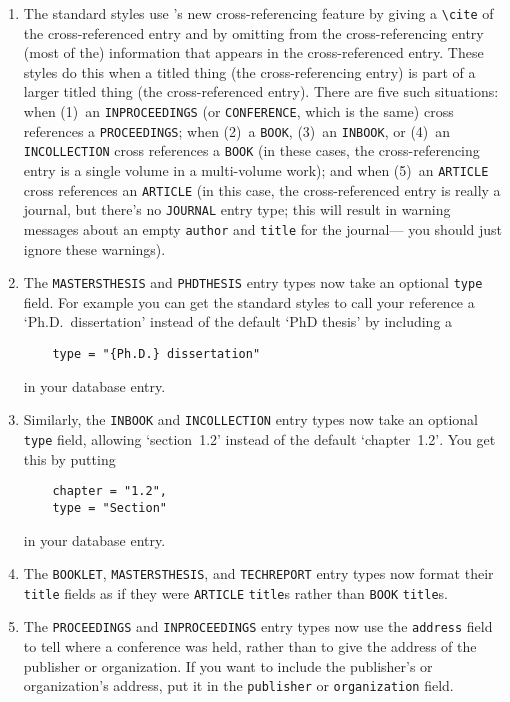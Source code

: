\begin{enumerate}
\item
The standard styles use \BibTeX's new cross-referencing feature
by giving a \verb|\cite| of the cross-referenced entry and by
omitting from the cross-referencing entry
(most of the) information that appears
in the cross-referenced entry.
These styles do this when
a titled thing (the cross-referencing entry)
is part of a larger titled thing (the cross-referenced entry).
There are five such situations:
when (1)~an \hbox{\tt INPROCEEDINGS}
(or \hbox{\tt CONFERENCE}, which is the same)
cross references a \hbox{\tt PROCEEDINGS};
when (2)~a {\tt BOOK}, (3)~an \hbox{\tt INBOOK},
or (4)~an \hbox{\tt INCOLLECTION}
cross references a {\tt BOOK}
(in these cases, the cross-referencing entry is a single
volume in a multi-volume work);
and when (5)~an \hbox{\tt ARTICLE}
cross references an \hbox{\tt ARTICLE}
(in this case, the cross-referenced entry is really a journal,
but there's no \hbox{\tt JOURNAL} entry type;
this will result in warning messages about
an empty \hbox{\tt author} and \hbox{\tt title} for the journal---%
you should just ignore these warnings).

\item
The \hbox{\tt MASTERSTHESIS} and \hbox{\tt PHDTHESIS}
entry types now take an optional {\tt type} field.
For example you can get the standard styles to
call your reference a `Ph.D.\ dissertation'
instead of the default `PhD thesis' by including a
\begin{verbatim}
    type = "{Ph.D.} dissertation"
\end{verbatim}
in your database entry.

\item
Similarly, the \hbox{\tt INBOOK} and \hbox{\tt INCOLLECTION}
entry types now take an optional {\tt type} field,
allowing `section~1.2' instead of the default `chapter~1.2'$\!$.
You get this by putting
\begin{verbatim}
    chapter = "1.2",
    type = "Section"
\end{verbatim}
in your database entry.

\item
The \hbox{\tt BOOKLET}, \hbox{\tt MASTERSTHESIS},
and \hbox{\tt TECHREPORT} entry types now format
their \hbox{\tt title} fields as if they were
\hbox{\tt ARTICLE} \hbox{\tt title}s
rather than \hbox{\tt BOOK} \hbox{\tt title}s.

\item
The \hbox{\tt PROCEEDINGS} and \hbox{\tt INPROCEEDINGS}
entry types now use the \hbox{\tt address} field
to tell where a conference was held,
rather than to give the address
of the publisher or organization.
If you want to include the
publisher's or organization's address,
put it in the \hbox{\tt publisher}
or \hbox{\tt organization} field.


\end{enumerate}
